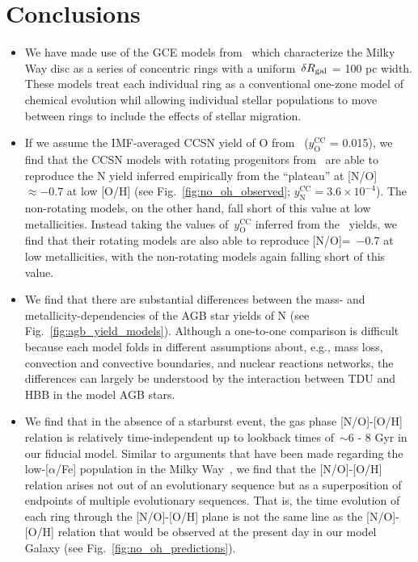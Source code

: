 \documentclass[ms.tex]{subfiles}
\begin{document}
 

\section{Conclusions} 
\label{sec:conclusions} 

\begin{itemize} 
	\item We have made use of the GCE models from~\citet{Johnson2021} which 
	characterize the Milky Way disc as a series of concentric rings with a 
	uniform~$\delta R_\text{gal}$ = 100 pc width. 
	These models treat each individual ring as a conventional one-zone model 
	of chemical evolution whil allowing individual stellar populations to move 
	between rings to include the effects of stellar migration. 

	\item If we assume the IMF-averaged CCSN yield of O from~\citet{Johnson2021} 
	($y_\text{O}^\text{CC}$ = 0.015), we find that the CCSN models with 
	rotating progenitors from~\citet{Limongi2018} are able to reproduce the 
	N yield inferred empirically from the ``plateau'' at [N/O]~$\approx -0.7$ 
	at low [O/H] (see Fig.~\ref{fig:no_oh_observed}; 
	$y_\text{N}^\text{CC} = 3.6\times10^{-4}$). 
	The non-rotating models, on the other hand, fall short of this value at 
	low metallicities. 
	Instead taking the values of~$y_\text{O}^\text{CC}$ inferred from 
	the~\citet{Limongi2018} yields, we find that their rotating models are also 
	able to reproduce [N/O]\subcc =~$-0.7$ at low metallicities, with the 
	non-rotating models again falling short of this value. 

	\item We find that there are substantial differences between the mass- and 
	metallicity-dependencies of the AGB star yields of N (see 
	Fig.~\ref{fig:agb_yield_models}). 
	Although a one-to-one comparison is difficult because each model folds in 
	different assumptions about, e.g., mass loss, convection and convective 
	boundaries, and nuclear reactions networks, the differences can largely be 
	understood by the interaction between TDU and HBB in the model AGB stars. 

	\item We find that in the absence of a starburst event, the gas phase 
	[N/O]-[O/H] relation is relatively time-independent up to lookback times 
	of~$\sim$6 - 8 Gyr in our fiducial model. 
	Similar to arguments that have been made regarding the low-[$\alpha$/Fe] 
	population in the Milky Way~\citep[e.g.][]{Schoenrich2009, Sharma2020, 
	Johnson2021}, we find that the [N/O]-[O/H] relation arises not out of an 
	evolutionary sequence but as a superposition of endpoints of multiple 
	evolutionary sequences. 
	That is, the time evolution of each ring through the [N/O]-[O/H] plane is 
	not the same line as the [N/O]-[O/H] relation that would be observed at the 
	present day in our model Galaxy (see Fig.~\ref{fig:no_oh_predictions}). 


\end{itemize}
\end{document}

